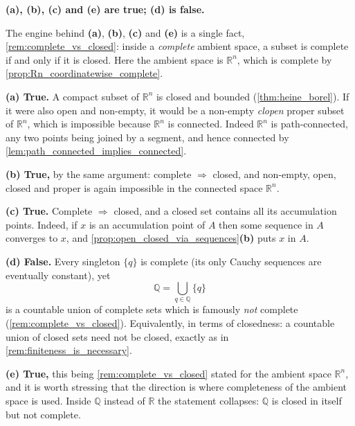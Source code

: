 \begin{exercisesolution}
\label{sol:open_complete_compact_multiple_choice}
\textbf{(a), (b), (c) and (e) are true; (d) is false.}

The engine behind \textbf{(a)}, \textbf{(b)}, \textbf{(c)} and \textbf{(e)} is a single fact,
\cref{rem:complete_vs_closed}: inside a \emph{complete} ambient space, a subset is complete if and
only if it is closed. Here the ambient space is $\mathbb{R}^n$, which is complete by
\cref{prop:Rn_coordinatewise_complete}.

\textbf{(a) True.} A compact subset of $\mathbb{R}^n$ is closed and bounded
(\cref{thm:heine_borel}). If it were also open and non-empty, it would be a non-empty
\emph{clopen} proper subset of $\mathbb{R}^n$, which is impossible because $\mathbb{R}^n$ is
connected. Indeed $\mathbb{R}^n$ is path-connected, any two points being joined by a segment, and
hence connected by \cref{lem:path_connected_implies_connected}.

\textbf{(b) True,} by the same argument: complete $\Rightarrow$ closed, and non-empty, open,
closed and proper is again impossible in the connected space $\mathbb{R}^n$.

\textbf{(c) True.} Complete $\Rightarrow$ closed, and a closed set contains all its accumulation
points. Indeed, if $x$ is an accumulation point of $A$ then some sequence in $A$ converges to $x$,
and \cref{prop:open_closed_via_sequences}\textbf{(b)} puts $x$ in $A$.

\textbf{(d) False.} Every singleton $\{q\}$ is complete (its only Cauchy sequences are
eventually constant), yet
\[\mathbb{Q} = \bigcup_{q \in \mathbb{Q}}\{q\}\]
is a countable union of complete sets which is famously \emph{not} complete
(\cref{rem:complete_vs_closed}). Equivalently, in terms of closedness: a countable union of
closed sets need not be closed, exactly as in \cref{rem:finiteness_is_necessary}.

\textbf{(e) True,} this being \cref{rem:complete_vs_closed} stated for the ambient space
$\mathbb{R}^n$, and it is worth stressing that the  direction is where completeness of the
ambient space is used. Inside $\mathbb{Q}$ instead of $\mathbb{R}$ the statement collapses:
$\mathbb{Q}$ is closed in itself but not complete.
\end{exercisesolution}

